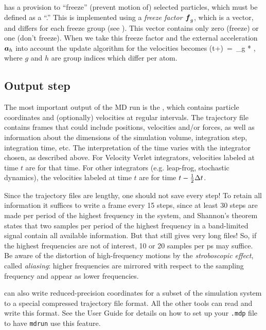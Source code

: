 {\gromacs} has a provision to ``freeze''  (prevent motion of) selected
particles, which must be defined as a ``.'' This is implemented
using a {\em freeze factor $\ve{f}_g$}, which is a vector, and differs for each
freeze group (see ). This vector contains only
zero (freeze) or one (don't freeze).
When we take this freeze factor and the external acceleration $\ve{a}_h$ into 
account the update algorithm for the velocities becomes
\beq
{}(t+\hdt)~=~_g * \lambda * ,
\eeq
where $g$ and $h$ are group indices which differ per atom.

\subsection{Output step}
The most important output of the MD run is the {\em
{}}, which contains particle coordinates
and (optionally) velocities at regular intervals.
The trajectory file contains frames that could include positions,
velocities and/or forces, as well as information about the dimensions
of the simulation volume, integration step, integration time, etc. The
interpretation of the time varies with the integrator chosen, as
described above. For Velocity Verlet integrators, velocities labeled
at time $t$ are for that time. For other integrators (e.g. leap-frog,
stochastic dynamics), the velocities labeled at time $t$ are for time
$t - \hDt$.

Since the trajectory
files are lengthy, one should not save every step! To retain all
information it suffices to write a frame every 15 steps, since at
least 30 steps are made per period of the highest frequency in the
system, and Shannon's  theorem states that two samples per
period of the highest frequency in a band-limited signal contain all
available information. But that still gives very long files! So, if
the highest frequencies are not of interest, 10 or 20 samples per ps
may suffice. Be aware of the distortion of high-frequency motions by
the {\em stroboscopic effect}, called {\em aliasing}: higher frequencies
are  mirrored with respect to the sampling frequency and appear as
lower frequencies.

{\gromacs} can also write reduced-precision coordinates for a subset of
the simulation system to a special compressed trajectory file
format. All the other tools can read and write this format. See
the User Guide for details on how to set up your {\tt .mdp} file
to have {\tt mdrun} use this feature.


